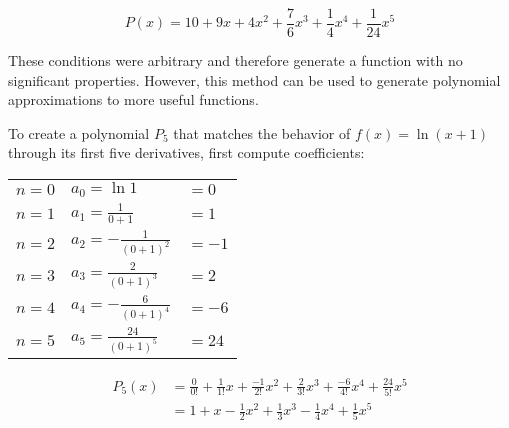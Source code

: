 \documentclass[10pt]{article}
\theoremstyle{definition}
\begin{document}
\[P(x)=10+9x+4x^2+\frac{7}{6}x^3+\frac{1}{4}x^4+\frac{1}{24}x^5\]

These conditions were arbitrary and therefore generate a function with no significant properties. However, this method can be used to generate polynomial approximations to more useful functions.

\newpage

To create a polynomial $P_5$ that matches the behavior of $f(x)=\ln (x+1)$ through its first five derivatives, first compute coefficients:

\renewcommand{\arraystretch}{1.2}

\begin{center}
\begin{tabular}{l l l}
$n=0$    &$a_0=\ln 1$ & $= 0$ \\
$n=1$    &$a_1=\frac{1}{0+1}$ & $=1$ \\
$n=2$    &$a_2=-\frac{1}{(0+1)^2}$ & $= -1$ \\
$n=3$    &$a_3=\frac{2}{(0+1)^3}$ & $= 2$ \\
$n=4$    &$a_4=-\frac{6}{(0+1)^4}$ & $= -6$ \\
$n=5$    &$a_5=\frac{24}{(0+1)^5}$ & $= 24$ \\
\end{tabular}
\end{center}

\begin{equation}
\begin{split}
    P_5(x)&=\frac{0}{0!}+\frac{1}{1!}x+\frac{-1}{2!}x^2+\frac{2}{3!}x^3+\frac{-6}{4!}x^4+\frac{24}{5!}x^5 \\
    &= 1+x-\frac{1}{2}x^2+\frac{1}{3}x^3-\frac{1}{4}x^4+\frac{1}{5}x^5
\end{split}
\end{equation}
\end{document}
